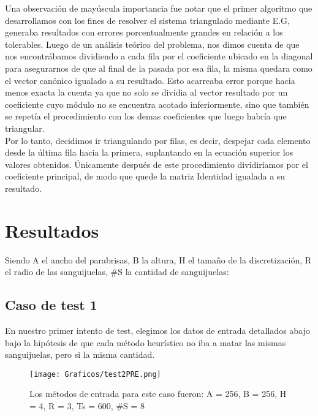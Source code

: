 \documentclass[double, 1.5in, 12pt]{beavtex}
\begin{document}
Una observaci\'on de may\'uscula importancia fue notar que el primer algoritmo que desarrollamos con los fines de resolver el sistema triangulado mediante E.G, generaba resultados con errores porcentualmente grandes en relaci\'on a los tolerables. Luego de un an\'alisis te\'orico del problema, nos dimos cuenta de que nos encontr\'abamos dividiendo a cada fila por el coeficiente ubicado en la diagonal para asegurarnos de que al final de la pasada por esa fila, la misma quedara como el vector can\'onico igualado a su resultado. Esto acarreaba error porque hacia menos exacta la cuenta ya que no solo se dividia al vector resultado por un coeficiente cuyo m\'odulo no se encuentra acotado inferiormente, sino que tambi\'en se repet\'ia el procedimiento con los demas coeficientes que luego habr\'ia que triangular. \\
Por lo tanto, decidimos ir triangulando por filas, es decir, despejar cada elemento desde la \'ultima fila hacia la primera, suplantando en la ecuaci\'on superior los valores obtenidos. \'Unicamente despu\'es de este procedimiento dividir\'iamos por el coeficiente principal, de modo que quede la matriz Identidad igualada a su resultado. \\





\chapter{Resultados}
Siendo A el ancho del parabrisas, B la altura, H el tama\~no de la discretizaci\'on, R el radio de las sanguijuelas, $\#$S la cantidad de sanguijuelas:
\section{Caso de test 1}
En nuestro primer intento de test, elegimos los datos de entrada detallados abajo bajo la hip\'otesis de que cada m\'etodo heur\'istico no iba a matar las mismas sanguijuelas, pero si la misma cantidad.
\begin{figure}[H]
\begin{center}
	\texttt{[image: Graficos/test2PRE.png]}
	\caption{Los m\'etodos de entrada para este caso fueron:
A = 256, 
B = 256, 
H = 4, 
R = 3, 
Ts = 600, 
$\#$S = 8}
	\label{fig:frog}
	\end{center}
\end{figure}
\end{document}
